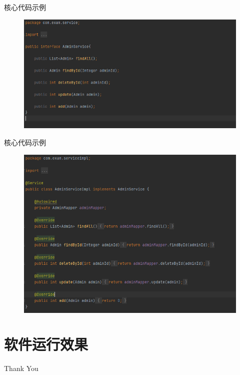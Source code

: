 \documentclass{beamer}
\begin{document}
\begin{frame}{核心代码示例}
    \begin{figure}
        \centering
        \includegraphics[width=0.85\linewidth]{code (4).png}
    \end{figure}
\end{frame}
\begin{frame}{核心代码示例}
    \begin{figure}
        \centering
        \includegraphics[width=0.85\linewidth]{code (5).png}
    \end{figure}
\end{frame}
\section{软件运行效果}
\begin{frame}
    \centering\Huge{Thank You}
\end{frame}
\end{document}
